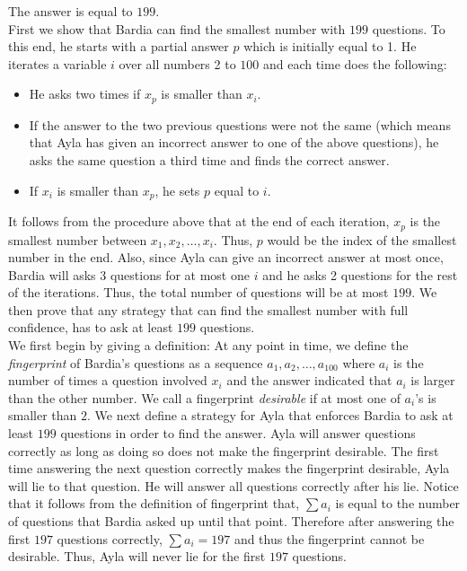 \begin{solution}
The answer is equal to $199$.\\[0.2cm]

First we show that Bardia can find the smallest number with $199$ questions. To this end, he starts with a partial answer $p$ which is initially equal to 1. He iterates a variable $i$ over all numbers 2 to $100$ and each time does the following:
\begin{itemize}
	\item He asks two times if $x_p$ is smaller than $x_i$.
	\item If the answer to the two previous questions were not the same (which means that Ayla has given an incorrect answer to one of the above questions), he asks the same question a third time and finds the correct answer.
	\item If $x_i$ is smaller than $x_p$, he sets $p$ equal to $i$.
\end{itemize}

It follows from the procedure above that at the end of each iteration, $x_p$ is the smallest number between $x_1, x_2, \ldots, x_i$. Thus, $p$ would be the index of the smallest number in the end. Also, since Ayla can give an incorrect answer at most once, Bardia will asks 3 questions for at most one $i$ and he asks 2 questions for the rest of the iterations. Thus, the total number of questions will be at most $199$. We then prove that any strategy that can find the smallest number with full confidence, has to ask at least $199$ questions.\\[0.2cm]

We first begin by giving a definition: At any point in time, we define the \textit{fingerprint} of Bardia's questions as a sequence $a_1, a_2, \ldots, a_{100}$ where $a_i$ is the number of times a question involved $x_i$ and the answer indicated that $a_i$ is larger than the other number. We call a fingerprint \textit{desirable} if at most one of $a_i$'s is smaller than $2$. We next define a strategy for Ayla that enforces Bardia to ask at least $199$ questions in order to find the answer. Ayla will answer questions correctly as long as doing so does not make the fingerprint desirable. The first time answering the next question correctly makes the fingerprint desirable, Ayla will lie to that question. He will answer all questions correctly after his lie. Notice that it follows from the definition of fingerprint that, $\sum a_i$ is equal to the number of questions that Bardia asked up until that point. Therefore after answering the first $197$ questions correctly, $\sum a_i = 197$ and thus the fingerprint cannot be desirable. Thus, Ayla will never lie for the first $197$ questions.


\end{solution}

